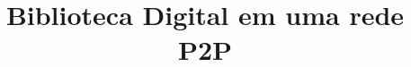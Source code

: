 \documentclass{acm_proc_article-sp}
\begin{document}
\title{Biblioteca Digital em uma rede P2P}
%
%
%
%
%
\end{document}
